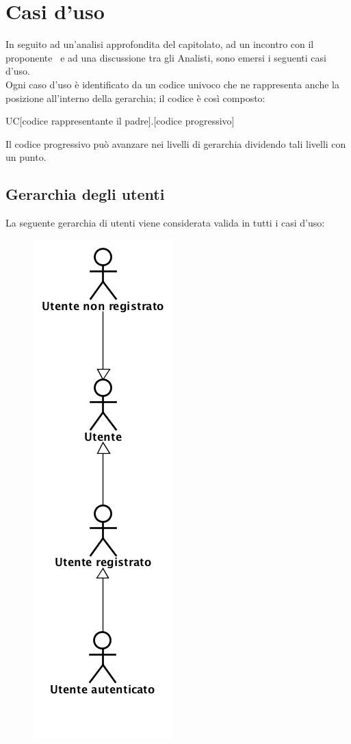 \section{Casi d'uso}
In seguito ad un'analisi approfondita del capitolato, ad un incontro con il proponente \Zucchetti\ e ad una discussione tra gli Analisti, sono emersi i seguenti casi d'uso.\\
Ogni caso d'uso è identificato da un codice univoco che ne rappresenta anche la posizione all'interno della gerarchia; il codice è così composto:
\begin{center}
UC[codice rappresentante il padre].[codice progressivo]
\end{center}
Il codice progressivo può avanzare nei livelli di gerarchia dividendo tali livelli con un punto.
\newpage
\subsection{Gerarchia degli utenti}
La seguente gerarchia di utenti viene considerata valida in tutti i casi d'uso:
\begin{figure}[h]
\begin{center}
	 \includegraphics[scale=0.5]{diagram/gerarchia.png}
\end{center}
\end{figure}
\newpage

